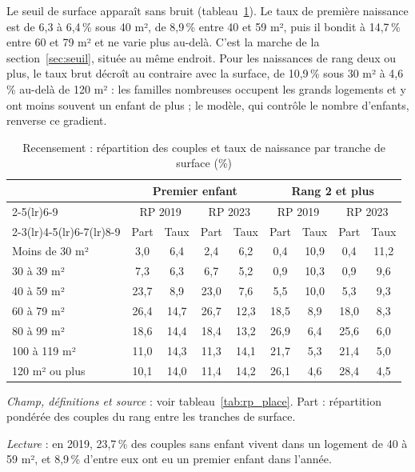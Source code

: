 \documentclass[11pt,a4paper]{article}
\theoremstyle{plain}
\theoremstyle{definition}
\theoremstyle{remark}
\begin{document}
Le seuil de surface apparaît sans bruit (tableau~\ref{tab:rp_surface}). Le taux de première naissance est de 6,3 à 6,4\,\% sous 40 m², de 8,9\,\% entre 40 et 59 m², puis il bondit à 14,7\,\% entre 60 et 79 m² et ne varie plus au-delà. C'est la marche de la section~\ref{sec:seuil}, située au même endroit. Pour les naissances de rang deux ou plus, le taux brut décroît au contraire avec la surface, de 10,9\,\% sous 30 m² à 4,6\,\% au-delà de 120 m² : les familles nombreuses occupent les grands logements et y ont moins souvent un enfant de plus ; le modèle, qui contrôle le nombre d'enfants, renverse ce gradient.

\begin{table}[htbp]
\centering\small
\setlength{\tabcolsep}{4pt}
\begin{threeparttable}
\caption{Recensement : répartition des couples et taux de naissance par tranche de surface (\%)}\label{tab:rp_surface}
\begin{tabular}{@{}lcccccccc@{}}
\toprule
& \multicolumn{4}{c}{Premier enfant} & \multicolumn{4}{c}{Rang 2 et plus} \\
\cmidrule(lr){2-5}\cmidrule(lr){6-9}
& \multicolumn{2}{c}{RP 2019} & \multicolumn{2}{c}{RP 2023} & \multicolumn{2}{c}{RP 2019} & \multicolumn{2}{c}{RP 2023} \\
\cmidrule(lr){2-3}\cmidrule(lr){4-5}\cmidrule(lr){6-7}\cmidrule(lr){8-9}
& Part & Taux & Part & Taux & Part & Taux & Part & Taux \\
\midrule
Moins de 30 m² & 3,0 & 6,4 & 2,4 & 6,2 & 0,4 & 10,9 & 0,4 & 11,2 \\
30 à 39 m² & 7,3 & 6,3 & 6,7 & 5,2 & 0,9 & 10,3 & 0,9 & 9,6 \\
40 à 59 m² & 23,7 & 8,9 & 23,0 & 7,6 & 5,5 & 10,0 & 5,3 & 9,3 \\
60 à 79 m² & 26,4 & 14,7 & 26,7 & 12,3 & 18,5 & 8,9 & 18,0 & 8,3 \\
80 à 99 m² & 18,6 & 14,4 & 18,4 & 13,2 & 26,9 & 6,4 & 25,6 & 6,0 \\
100 à 119 m² & 11,0 & 14,3 & 11,3 & 14,1 & 21,7 & 5,3 & 21,4 & 5,0 \\
120 m² ou plus & 10,1 & 14,0 & 11,4 & 14,2 & 26,1 & 4,6 & 28,4 & 4,5 \\
\bottomrule
\end{tabular}
\begin{tablenotes}\scriptsize
\item \textit{Champ, définitions et source} : voir tableau~\ref{tab:rp_place}. Part : répartition pondérée des couples du rang entre les tranches de surface.
\item \textit{Lecture} : en 2019, 23,7\,\% des couples sans enfant vivent dans un logement de 40 à 59 m², et 8,9\,\% d'entre eux ont eu un premier enfant dans l'année.
\end{tablenotes}
\end{threeparttable}
\end{table}
\end{document}
